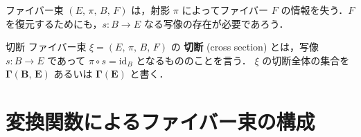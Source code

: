 \documentclass[geometry_main]{subfiles}
\begin{document}


ファイバー束 $(E,\, \pi,\, B,\, F)$ は，射影 $\pi$ によってファイバー $F$ の情報を失う．$F$ を復元するためにも，$s \colon B \to E$ なる写像の存在が必要であろう．

\begin{mydef}[label=def.section]{\cinfty 切断}
	ファイバー束 $\xi = (E,\, \pi,\, B,\, F)$ の \cinfty \textbf{切断} (cross section) とは，\cinfty 写像 $s \colon B \to E$ であって $ \pi \circ s = \mathrm{id}_B$ となるもののことを言う．
    \tcblower 
    $\xi$ の切断全体の集合を $\bm{\Gamma (B,\, E)}$ あるいは $\bm{\Gamma(E)}$ と書く．
\end{mydef}



\section{変換関数によるファイバー束の構成}
\end{document}
